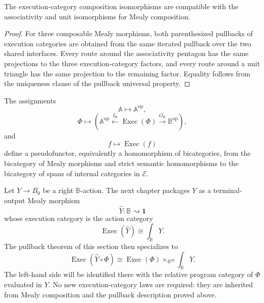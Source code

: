 \begin{proposition}
\label{prop:temporal-associative-coherence}
The execution-category composition isomorphisms are compatible with the
associativity and unit isomorphisms for Mealy composition.
\end{proposition}

\begin{proof}
For three composable Mealy morphisms, both parenthesized pullbacks of execution
categories are obtained from the same iterated pullback over the two shared
interfaces. Every route around the associativity pentagon has the same
projections to the three execution-category factors, and every route around a
unit triangle has the same projection to the remaining factor. Equality
follows from the uniqueness clause of the pullback universal property.
\end{proof}

\begin{remark}
\label{rem:execution-pseudofunctor}
The assignments
\[
    \mathbb A\longmapsto\mathbb A^{\mathrm{op}},
\]
\[
    \Phi\longmapsto
    \left(
        \mathbb A^{\mathrm{op}}
        \xleftarrow{I_\Phi}
        \operatorname{Exec}(\Phi)
        \xrightarrow{O_\Phi}
        \mathbb B^{\mathrm{op}}
    \right),
\]
and
\[
    f\longmapsto\operatorname{Exec}(f)
\]
define a pseudofunctor, equivalently a homomorphism of bicategories, from the
bicategory of Mealy morphisms and strict semantic homomorphisms to the
bicategory of spans of internal categories in \(\mathcal E\).
\end{remark}

\begin{remark}
\label{rem:temporal-downstream-specialization}
Let \(Y\to B_0\) be a right \(\mathbb B\)-action.  The next chapter packages
\(Y\) as a terminal-output Mealy morphism
\[
    \widehat Y:\mathbb B\rightsquigarrow\mathbf 1
\]
whose execution category is the action category
\[
    \operatorname{Exec}(\widehat Y)
    \cong
    \int_{\mathbb B}Y.
\]
The pullback theorem of this section then specializes to
\[
    \operatorname{Exec}(\widehat Y\circ\Phi)
    \cong
    \operatorname{Exec}(\Phi)
    \times_{\mathbb B^{\mathrm{op}}}
    \int_{\mathbb B}Y.
\]
The left-hand side will be identified there with the relative program
category of \(\Phi\) evaluated in \(Y\).  No new execution-category laws are
required: they are inherited from Mealy composition and the pullback
description proved above.
\end{remark}

